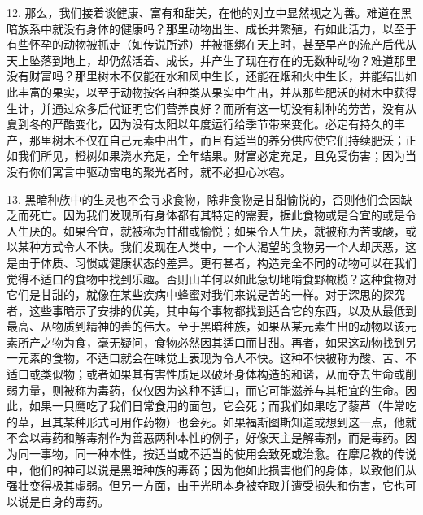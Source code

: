 12. 那么，我们接着谈健康、富有和甜美，在他的对立中显然视之为善。难道在黑暗族系中就没有身体的健康吗？那里动物出生、成长并繁殖，有如此活力，以至于有些怀孕的动物被抓走（如传说所述）并被捆绑在天上时，甚至早产的流产后代从天上坠落到地上，却仍然活着、成长，并产生了现在存在的无数种动物？难道那里没有财富吗？那里树木不仅能在水和风中生长，还能在烟和火中生长，并能结出如此丰富的果实，以至于动物按各自种类从果实中生出，并从那些肥沃的树木中获得生计，并通过众多后代证明它们营养良好？而所有这一切没有耕种的劳苦，没有从夏到冬的严酷变化，因为没有太阳以年度运行给季节带来变化。必定有持久的丰产，那里树木不仅在自己元素中出生，而且有适当的养分供应使它们持续肥沃；正如我们所见，橙树如果浇水充足，全年结果。财富必定充足，且免受伤害；因为当没有你们寓言中驱动雷电的聚光者时，就不必担心冰雹。\par

13. 黑暗种族中的生灵也不会寻求食物，除非食物是甘甜愉悦的，否则他们会因缺乏而死亡。因为我们发现所有身体都有其特定的需要，据此食物或是合宜的或是令人生厌的。如果合宜，就被称为甘甜或愉悦；如果令人生厌，就被称为苦或酸，或以某种方式令人不快。我们发现在人类中，一个人渴望的食物另一个人却厌恶，这是由于体质、习惯或健康状态的差异。更有甚者，构造完全不同的动物可以在我们觉得不适口的食物中找到乐趣。否则山羊何以如此急切地啃食野橄榄？这种食物对它们是甘甜的，就像在某些疾病中蜂蜜对我们来说是苦的一样。对于深思的探究者，这些事暗示了安排的优美，其中每个事物都找到适合它的东西，以及从最低到最高、从物质到精神的善的伟大。至于黑暗种族，如果从某元素生出的动物以该元素所产之物为食，毫无疑问，食物必然因其适口而甘甜。再者，如果这动物找到另一元素的食物，不适口就会在味觉上表现为令人不快。这种不快被称为酸、苦、不适口或类似物；或者如果其有害性质足以破坏身体构造的和谐，从而夺去生命或削弱力量，则被称为毒药，仅仅因为这种不适口，而它可能滋养与其相宜的生命。因此，如果一只鹰吃了我们日常食用的面包，它会死；而我们如果吃了藜芦（牛常吃的草，且其某种形式可用作药物）也会死。如果福斯图斯知道或想到这一点，他就不会以毒药和解毒剂作为善恶两种本性的例子，好像天主是解毒剂，而是毒药。因为同一事物，同一种本性，按适当或不适当的使用会致死或治愈。在摩尼教的传说中，他们的神可以说是黑暗种族的毒药；因为他如此损害他们的身体，以致他们从强壮变得极其虚弱。但另一方面，由于光明本身被夺取并遭受损失和伤害，它也可以说是自身的毒药。\par

